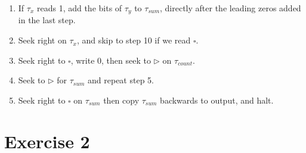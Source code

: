 \documentclass[12pt]{article}
\begin{document}
\begin{enumerate}
{\begin{enumerate}
\item{If $\tau_x$ reads 1, add the bits of $\tau_y$ to $\tau_{sum}$, directly after the leading zeros added in the last step.}
\item{Seek right on $\tau_x$, and skip to step 10 if we read $\square$.}
\item{Seek right to $\square$, write 0, then seek to $\triangleright$ on $\tau_{count}$.}
\item{Seek to $\triangleright$ for $\tau_{sum}$ and repeat step 5.}
\item{Seek right to $\square$ on $\tau_{sum}$ then copy $\tau_{sum}$ backwards to output, and halt.}
\end{enumerate}
}
\end{enumerate}

\section*{Exercise 2}
\end{document}

